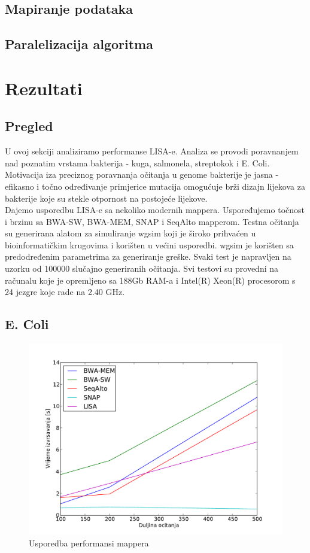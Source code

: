 \documentclass[times, utf8, diplomski]{fer}
\begin{document}
\section{Mapiranje podataka}
\section{Paralelizacija algoritma}

\chapter{Rezultati}

\section {Pregled}
U ovoj sekciji analiziramo performanse LISA-e. Analiza se provodi poravnanjem nad poznatim vrstama bakterija - kuga, salmonela, streptokok i E. Coli. Motivacija iza preciznog poravnanja očitanja u genome bakterije je jasna - efikasno i točno određivanje primjerice mutacija omogućuje brži dizajn lijekova za bakterije koje su stekle otpornost na postojeće lijekove.\\
Dajemo usporedbu LISA-e sa nekoliko modernih mappera. Uspoređujemo točnost i brzinu sa BWA-SW, BWA-MEM, SNAP i SeqAlto mapperom. Testna očitanja su generirana alatom za simuliranje wgsim koji je široko prihvaćen u bioinformatičkim krugovima i korišten u većini usporedbi. wgsim je korišten sa predodređenim parametrima za generiranje greške. Svaki test je napravljen na uzorku od 100000 slučajno generiranih očitanja. 
Svi testovi su provedni na računalu koje je opremljeno sa 188Gb RAM-a i Intel(R) Xeon(R) procesorom s 24 jezgre koje rade na 2.40 GHz. 

\section {E. Coli}

\begin{figure}[H]
\centering
\includegraphics[width=1.0\textwidth]{../img/ecoli-time.pdf}
\caption{Usporedba performansi mappera}
\label{ecoli-time}
\end{figure}
\end{document}
